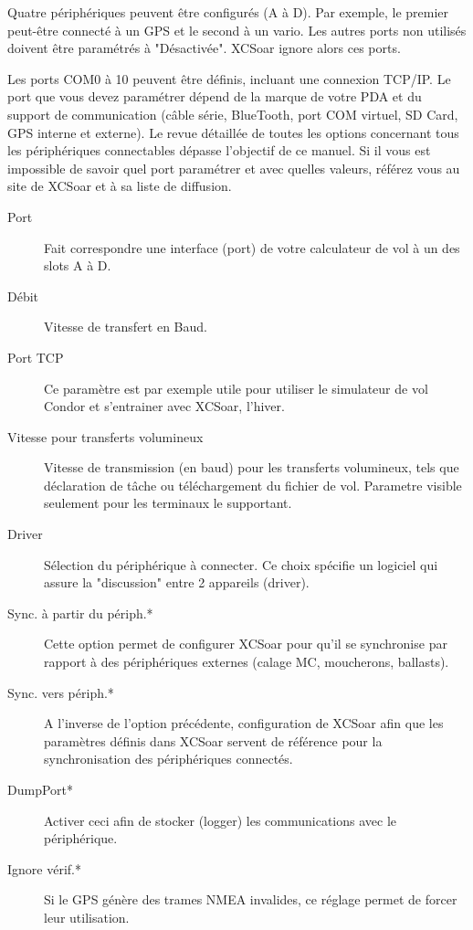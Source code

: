 Quatre périphériques peuvent être configurés (A à D). Par exemple, le premier peut-être connecté à un GPS et le second à un vario. Les autres ports non utilisés doivent être paramétrés à "Désactivée". XCSoar ignore alors ces ports.

Les ports COM0 à 10 peuvent être définis, incluant une connexion TCP/IP. Le port que vous devez paramétrer dépend de la marque de votre PDA et du support de communication (câble série, BlueTooth, port COM virtuel, SD Card, GPS interne et externe). Le revue détaillée de toutes les options concernant tous les périphériques connectables dépasse l'objectif de ce manuel. Si il vous est impossible de savoir quel port paramétrer et avec quelles valeurs, référez vous au site de XCSoar et à sa liste de diffusion.

\begin{description}
\item[Port]  Fait correspondre une interface (port) de votre calculateur de vol à un des slots A à D.
\item[Débit]  Vitesse de transfert en Baud.
\item[Port TCP]  Ce paramètre est par exemple utile pour utiliser le simulateur de vol Condor et s'entrainer avec XCSoar, l'hiver.
\item[Vitesse pour transferts volumineux]  Vitesse de transmission (en baud) pour les transferts volumineux, tels que déclaration de tâche ou téléchargement du fichier de vol. Parametre visible seulement pour les terminaux le supportant.
\item[Driver]  Sélection du périphérique à connecter. Ce choix spécifie un logiciel qui assure la "discussion" entre 2 appareils (driver).
\item[Sync. à partir du périph.*]  Cette option permet de configurer XCSoar pour qu'il se synchronise par rapport à des périphériques externes (calage MC, moucherons, ballasts).
\item[Sync. vers périph.*]  A l'inverse de l'option précédente, configuration de XCSoar afin que les paramètres définis dans XCSoar servent de référence pour la synchronisation des périphériques connectés.
\item[DumpPort*]  Activer ceci afin de stocker (logger) les communications avec le périphérique.
\item[Ignore vérif.*] Si le GPS génère des trames NMEA invalides, ce réglage permet de forcer leur utilisation.
\end{description}


